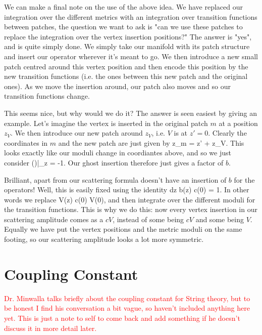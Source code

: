 We can make a final note on the use of the above idea. We have replaced our integration over the different metrics with an integration over transition functions between patches, the question we want to ask is "can we use these patches to replace the integration over the vertex insertion positions?" The answer is "yes", and is quite simply done. We simply take our manifold with its patch structure and insert our operator wherever it's meant to go. We then introduce a new small patch centred around this vertex position and then encode this position by the new transition functions (i.e. the ones between this new patch and the original ones). As we move the insertion around, our patch also moves and so our transition functions change. 

This seems nice, but why would we do it? The answer is seen easiest by giving an example. Let's imagine the vertex is inserted in the original patch $m$ at a position $z_V$. We then introduce our new patch around $z_V$, i.e. $V$ is at $z'=0$. Clearly the coordinates in $m$ and the new patch are just given by 
\bse 
    z_m = z' + z_V.
\ese 
This looks exactly like our moduli change in coordiantes above, and so we just consider 
\bse 
    \bigg(\bigg)\bigg|_{z} = -1.
\ese 
Our ghost insertion therefore just gives a factor of $b$. 

Brilliant, apart from our scattering formula doesn't have an insertion of $b$ for the operators! Well, this is easily fixed using the identity 
\bse 
    \oint dz b(z) c(0) = 1.
\ese 
In other words we replace 
\bse 
    V(z) \to c(0) V(0),
\ese 
and then integrate over the different moduli for the transition functions. This is why we do this: now every vertex insertion in our scattering amplitude comes as a $cV$, instead of some being $cV$ and some being $V$. Equally we have put the vertex positions and the metric moduli on the same footing, so our scattering amplitude looks a lot more symmetric.  

\section{Coupling Constant}

\textcolor{red}{Dr. Minwalla talks briefly about the coupling constant for String theory, but to be honest I find his conversation a bit vague, so haven't included anything here yet. This is just a note to self to come back and add something if he doesn't discuss it in more detail later.}